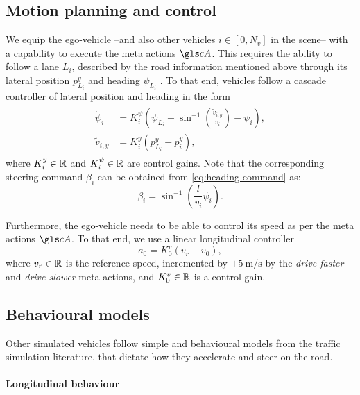 \subsection{Motion planning and control}

We equip the ego-vehicle --and also other vehicles $i\in[0, N_v]$ in the scene-- with a capability to execute the meta actions $\cA$. This requires the ability to follow a lane $L_i$, described by the road information mentioned above through its lateral position $p^y_{L_i}$ and heading $\psi_{L_i}$ . To that end, vehicles follow a cascade controller of lateral position and heading in the form
\begin{align}
\label{eq:heading-command}
\begin{split}
\dot{\psi}_i &= K_i^\psi\left(\psi_{L_i}+\sin^{-1}\left(\frac{\tilde{v}_{i,y}}{v_i}\right)-\psi_i\right),\\
\tilde{v}_{i,y} &= K_i^y (p^y_{L_i}-p^y_i),
\end{split}
\end{align}
where $K_i^y\in\mathbb{R}$ and $K_i^\psi\in\mathbb{R}$ are control gains.
Note that the corresponding steering command $\beta_i$ can be obtained from \eqref{eq:heading-command} as: $$\beta_i = \sin^{-1}\left(\frac{l}{v_i}\dot{\psi}_i\right).$$

Furthermore, the ego-vehicle needs to be able to control its speed as per the meta actions $\cA$. To that end, we use a linear longitudinal controller
\begin{equation*}
a_0 = K_0^v(v_r - v_0),
\end{equation*}
where $v_r\in\mathbb{R}$ is the reference speed, incremented by $\pm \SI[per-mode=symbol]{5}{\meter\per\second}$ by the \emph{drive faster} and \emph{drive slower} meta-actions, and $K_0^v\in\mathbb{R}$ is a control gain.

\subsection{Behavioural models}

Other simulated vehicles follow simple and behavioural models from the traffic simulation literature, that dictate how they accelerate and steer on the road.

\paragraph{Longitudinal behaviour}

